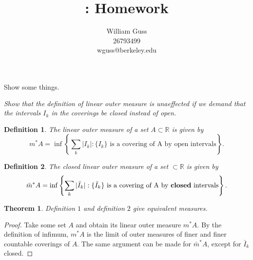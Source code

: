 \documentclass[letter]{article}
\title{\bCLASS: Homework \bHWN}
\author{William Guss\\26793499\\wguss@berkeley.edu}
\newtheorem{theorem}{Theorem}
\newtheorem{definition}{Definition}
\newenvironment{menumerate}{%
  \edef\backupindent{\the\parindent}%
  \enumerate%
  \setlength{\parindent}{\backupindent}%
}{\endenumerate}
\begin{document}
\maketitle
\thispagestyle{empty}


\begin{menumerate}
\item Show some things.
	\begin{menumerate}
		\item \emph{Show that the definition of linear outer measure is unaeffected if we demand that the intervals $I_k$ in the coverings be closed instead of open.}
		\begin{definition}
			The linear outer measure of a set $A \subset \mathbb{R}$ is given by
			\begin{equation}
				m^*A = \inf \left\{\sum_k |I_k| : \{I_k\}\text{ is a covering of A by open intervals}\right\}.
			\end{equation}
		\end{definition}
		\begin{definition}
			The closed linear outer measure of a set $ \subset \mathbb{R}$ is given by
			\begin{equation}
				\bar m^*A = \inf \left\{\sum_k |\bar I_k| : \{\bar I_k\}\text{ is a covering of A by \textbf{closed} intervals}\right\}.
			\end{equation}
		\end{definition}
		\begin{theorem}
			Definition $1$ and definition $2$ give equivalent measures.
		\end{theorem}
		\begin{proof}
			Take some set $A$ and obtain its linear outer measure $m^*A$. By the definition of infimum,
			$m^* A$ is the limit of outer measures of finer and finer countable 
			coverings of $A.$ The same argument can be made for $\bar m^* A$, except for $\bar I_k$ closed.


\end{proof}
\end{menumerate}
\end{menumerate}
\end{document}
